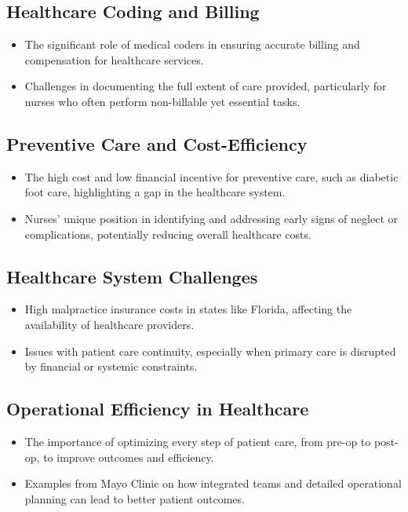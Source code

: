 \documentclass{article}
\begin{document}
\subsection*{Healthcare Coding and Billing}
\begin{itemize}
    \item The significant role of medical coders in ensuring accurate billing and compensation for healthcare services.
    \item Challenges in documenting the full extent of care provided, particularly for nurses who often perform non-billable yet essential tasks.
\end{itemize}

\subsection*{Preventive Care and Cost-Efficiency}
\begin{itemize}
    \item The high cost and low financial incentive for preventive care, such as diabetic foot care, highlighting a gap in the healthcare system.
    \item Nurses' unique position in identifying and addressing early signs of neglect or complications, potentially reducing overall healthcare costs.
\end{itemize}

\subsection*{Healthcare System Challenges}
\begin{itemize}
    \item High malpractice insurance costs in states like Florida, affecting the availability of healthcare providers.
    \item Issues with patient care continuity, especially when primary care is disrupted by financial or systemic constraints.
\end{itemize}

\subsection*{Operational Efficiency in Healthcare}
\begin{itemize}
    \item The importance of optimizing every step of patient care, from pre-op to post-op, to improve outcomes and efficiency.
    \item Examples from Mayo Clinic on how integrated teams and detailed operational planning can lead to better patient outcomes.
\end{itemize}
\end{document}

